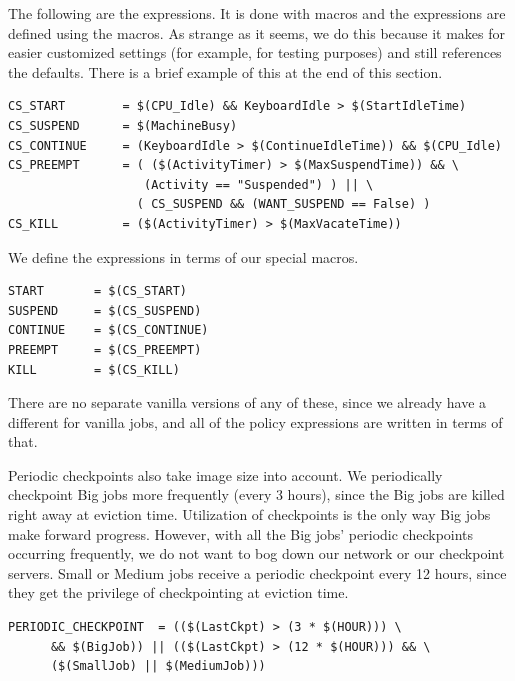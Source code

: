 The following are the expressions.
It is done with macros and the expressions are defined using
the macros.
As strange as it seems,
we do this because it makes for easier
customized settings (for example, for testing purposes)
and still references the defaults.
There is a brief example of this at the end of this section.
\begin{verbatim}
CS_START        = $(CPU_Idle) && KeyboardIdle > $(StartIdleTime)
CS_SUSPEND      = $(MachineBusy)
CS_CONTINUE     = (KeyboardIdle > $(ContinueIdleTime)) && $(CPU_Idle)
CS_PREEMPT      = ( ($(ActivityTimer) > $(MaxSuspendTime)) && \
                   (Activity == "Suspended") ) || \
                  ( CS_SUSPEND && (WANT_SUSPEND == False) )
CS_KILL         = ($(ActivityTimer) > $(MaxVacateTime))
\end{verbatim}

We define the expressions in terms of our special macros.
\begin{verbatim}
START       = $(CS_START)
SUSPEND     = $(CS_SUSPEND)
CONTINUE    = $(CS_CONTINUE)
PREEMPT     = $(CS_PREEMPT)
KILL        = $(CS_KILL)
\end{verbatim}

There are no
separate vanilla versions of any of
these, since we already have a different  for
vanilla jobs, and all of the policy expressions are written in
terms of that.

Periodic checkpoints also take image size into account.  
We periodically checkpoint Big jobs more frequently (every 3 hours),
since the Big jobs are killed right away at eviction time.
Utilization of checkpoints is the only way Big jobs make forward progress.
However, with all the Big jobs' periodic checkpoints occurring
frequently, we do not want to bog down our network or our checkpoint
servers.
Small or Medium jobs receive a periodic checkpoint
every 12 hours,
since they get the privilege of checkpointing at eviction time.
\begin{verbatim}
PERIODIC_CHECKPOINT  = (($(LastCkpt) > (3 * $(HOUR))) \
      && $(BigJob)) || (($(LastCkpt) > (12 * $(HOUR))) && \
      ($(SmallJob) || $(MediumJob)))
\end{verbatim}

